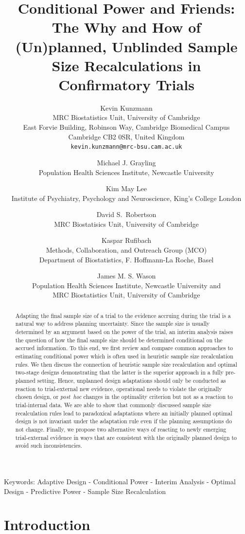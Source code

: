 \documentclass[12pt]{article}
\title{Conditional Power and Friends: The Why and How of (Un)planned, Unblinded Sample Size Recalculations in Confirmatory Trials}
\author{
    \footnotesize Kevin Kunzmann\\
    \footnotesize MRC Biostatistics Unit, University of Cambridge \\
    \footnotesize
    East Forvie Building, Robinson Way,
    Cambridge Biomedical Campus \\
    \footnotesize Cambridge CB2 0SR,
    United Kingdom \\
    \footnotesize \texttt{kevin.kunzmann@mrc-bsu.cam.ac.uk}
    \and
    \footnotesize Michael J. Grayling \\
    \footnotesize Population Health Sciences Institute, Newcastle University
    \and
    \footnotesize Kim May Lee \\
    \footnotesize Institute of Psychiatry, Psychology and Neuroscience, King's College London
    \and
    \footnotesize David S.\ Robertson \\
    \footnotesize MRC Biostatisics Unit, University of Cambridge
    \and
    \footnotesize Kaspar Rufibach \\
    \footnotesize Methods, Collaboration, and Outreach Group (MCO) \\
    \footnotesize Department of Biostatistics, F. Hoffmann-La Roche, Basel
    \and
    \footnotesize James M. S. Wason \\
    \footnotesize Population Health Sciences Institute, Newcastle University and \\
    \footnotesize MRC Biostatistics Unit, University of Cambridge
}
\begin{document}
\maketitle

\captionsetup{width=\textwidth}


\newpage

\begin{abstract}
Adapting the final sample size of a trial to the evidence accruing
during the trial is a natural way to address planning uncertainty.
Since the sample size is usually determined by an
argument based on the power of the trial,
an interim analysis raises the question of
how the final sample size should be determined conditional on the accrued information.
To this end, we first review and compare common approaches to estimating conditional power
which is often used in heuristic sample size recalculation rules.
We then discuss the connection of heuristic sample size recalculation and
optimal two-stage designs demonstrating that the latter is the superior approach in a fully pre-planned setting.
Hence, unplanned design adaptations should only be conducted
as reaction to trial-external new evidence, operational needs to violate the originally chosen design,
or \textit{post~hoc} changes in the optimality criterion but not as a reaction to trial-internal data.
We are able to show that commonly discussed sample size recalculation rules lead to paradoxical adaptations
where an initially planned optimal design is not invariant under the adaptation rule
even if the planning assumptions do not change.
Finally, we propose two alternative ways of reacting to
newly emerging trial-external evidence in ways that are consistent with the originally
planned design to avoid such inconsistencies.
\end{abstract}

Keywords: Adaptive Design - Conditional Power - Interim Analysis - Optimal Design - Predictive Power - Sample Size Recalculation

\newpage

\section{Introduction}
\label{sec:introduction}
\end{document}
